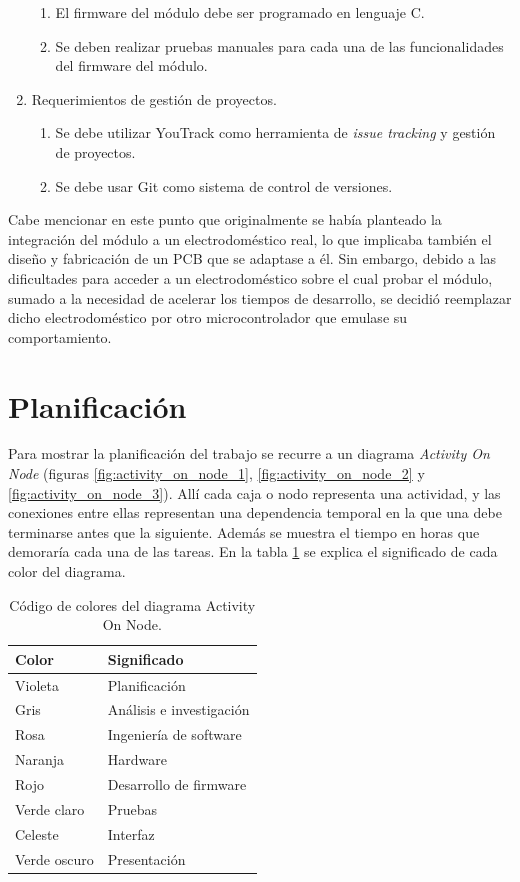 \begin{enumerate}
	\begin{enumerate}
		\item El firmware del módulo debe ser programado en lenguaje C.
		\item Se deben realizar pruebas manuales para cada una de las funcionalidades del firmware del módulo.
	\end{enumerate}
	\item Requerimientos de gestión de proyectos.
	\begin{enumerate}
		\item Se debe utilizar YouTrack \citep{youtrack} como herramienta de \emph{issue tracking} y gestión de proyectos.
		\item Se debe usar Git como sistema de control de versiones.
	\end{enumerate}
\end{enumerate}

Cabe mencionar en este punto que originalmente se había planteado la integración del módulo a un electrodoméstico real, lo que implicaba también el diseño y fabricación de un PCB que se adaptase a él. Sin embargo, debido a las dificultades para acceder a un electrodoméstico sobre el cual probar el módulo, sumado a la necesidad de acelerar los tiempos de desarrollo, se decidió reemplazar dicho electrodoméstico por otro microcontrolador que emulase su comportamiento.


\section{Planificación}

Para mostrar la planificación del trabajo se recurre a un diagrama \emph{Activity On Node} (figuras \ref{fig:activity_on_node_1}, \ref{fig:activity_on_node_2} y \ref{fig:activity_on_node_3}). Allí cada caja o nodo representa una actividad, y las conexiones entre ellas representan una dependencia temporal en la que una debe terminarse antes que la siguiente. Además se muestra el tiempo en horas que demoraría cada una de las tareas. En la tabla \ref{tab:codigo_colores} se explica el significado de cada color del diagrama.

\begin{table}[h]
	\centering
	\caption{Código de colores del diagrama Activity On Node.}
	\begin{tabular}{l l}    
		\toprule
		\textbf{Color}	& \textbf{Significado}				\\
		\midrule
		Violeta			& Planificación						\\
		Gris			& Análisis e investigación			\\
		Rosa			& Ingeniería de software			\\
		Naranja			& Hardware							\\
		Rojo			& Desarrollo de firmware			\\
		Verde claro		& Pruebas							\\
		Celeste 		& Interfaz							\\
		Verde oscuro 	& Presentación						\\
		\bottomrule
		\hline
	\end{tabular}
	\label{tab:codigo_colores}
\end{table}

